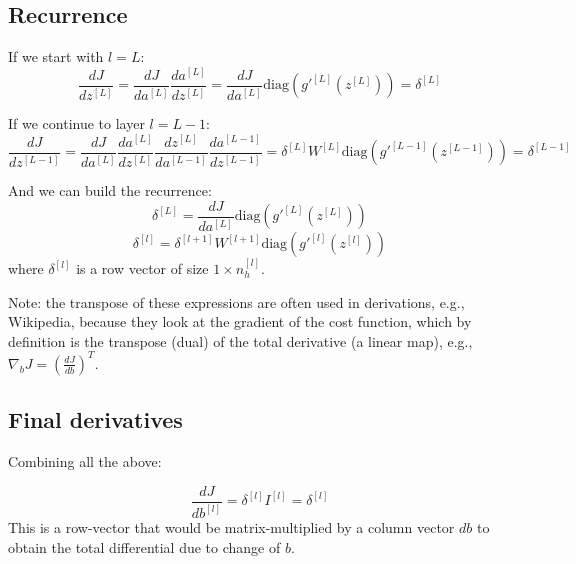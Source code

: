 \documentclass[letterpaper,12pt,oneside]{article}
\begin{document}
\subsection{Recurrence}

If we start with $l=L$:
\begin{equation}
\frac{dJ}{dz^{[L]}} =  \frac{dJ}{da^{[L]}} \frac{da^{[L]}}{dz^{[L]}} = \frac{dJ}{da^{[L]}} \mathrm{diag} \left( g'^{[L]} (z^{[L]}) \right) = \delta^{[L]}
\end{equation}

If we continue to layer $l=L-1$:
\begin{equation}
\frac{dJ}{dz^{[L-1]}} = \frac{dJ}{da^{[L]}} \frac{da^{[L]}}{dz^{[L]}} \frac{dz^{[L]}}{da^{[L-1]}} \frac{da^{[L-1]}}{dz^{[L-1]}} = \delta^{[L]} W^{[L]} \mathrm{diag} \left( g'^{[L-1]} (z^{[L-1]}) \right) = \delta^{[L-1]}
\end{equation}

And we can build the recurrence:
\begin{equation}
\delta^{[L]} = \frac{dJ}{da^{[L]}} \mathrm{diag} \left( g'^{[L]} (z^{[L]}) \right)
\end{equation}
\begin{equation}
\delta^{[l]} = \delta^{[l+1]} W^{[l+1]} \mathrm{diag} \left( g'^{[l]} (z^{[l]})\right)
\end{equation}
where $\delta^{[l]}$ is a row vector of size $1 \times n_h^{[l]}$.

Note: the transpose of these expressions are often used in derivations, e.g., Wikipedia, because they look at the gradient of the cost function, which by definition is the transpose (dual) of the total derivative (a linear map), e.g., $\nabla_b J = \left( \frac{dJ}{db} \right)^T$.

\subsection{Final derivatives}

Combining all the above:

\begin{equation}
\frac{dJ}{db^{[l]}} = \delta^{[l]}  I^{[l]} = \delta^{[l]}
\end{equation}
This is a row-vector that would be matrix-multiplied by a column vector $db$ to obtain the total differential due to change of $b$.
\end{document}
